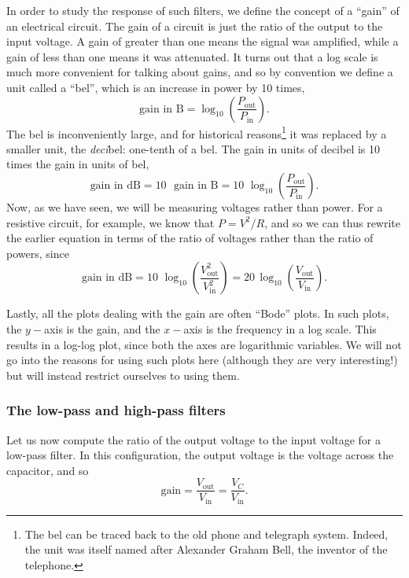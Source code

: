In order to study the response of such filters, we define the concept of a ``gain'' of an electrical circuit. The gain of a circuit is just the ratio of the output to the input voltage. A gain of greater than one means the signal was amplified, while a gain of less than one means it was attenuated. It turns out that a log scale is much more convenient for talking about gains, and so by convention we define a unit called a ``bel'', which is an increase in power by 10 times,
\begin{equation}
    \text{gain in B} = \log_{10}\left( \frac{P_\text{out}}{P_\text{in}} \right).
\end{equation}
The bel is inconveniently large, and for historical reasons\footnote{The bel can be traced back to the old phone and telegraph system. Indeed, the unit was itself named after Alexander Graham Bell, the inventor of the telephone.} it was replaced by a smaller unit, the \textsl{deci}bel: one-tenth of a bel. The gain in units of decibel is 10 times the gain in units of bel,
\begin{equation}
    \text{gain in dB} = 10\,\, \text{ gain in B} = 10 \,\,\log_{10}\left( \frac{P_\text{out}}{P_\text{in}} \right).
\end{equation}
Now, as we have seen, we will be measuring voltages rather than power. For a resistive circuit, for example, we know that $P =V^2/R$, and so we can thus rewrite the earlier equation in terms of the ratio of voltages rather than the ratio of powers, since
\begin{equation}
    \text{gain in dB} = 10 \,\,\log_{10} \left( \frac{V^2_\text{out}}{V^2_\text{in}} \right) = 20 \,\log_{10} \left( \frac{V_\text{out}}{V_\text{in}} \right).
\end{equation}

Lastly, all the plots dealing with the gain are often ``Bode'' plots. In such plots, the $y-$axis is the gain, and the $x-$axis is the frequency in a log scale. This results in a log-log plot, since both the axes are logarithmic variables. We will not go into the reasons for using such plots here (although they are very interesting!) but will instead restrict ourselves to using them.


\subsubsection*{The low-pass and high-pass filters}

Let us now compute the ratio of the output voltage to the input voltage for a low-pass filter. In this configuration, the output voltage is the voltage across the capacitor, and so 
\begin{equation}
    \text{gain} = \frac{V_\text{out}}{V_\text{in}} = \frac{V_C}{V_\text{in}}.
\end{equation}

